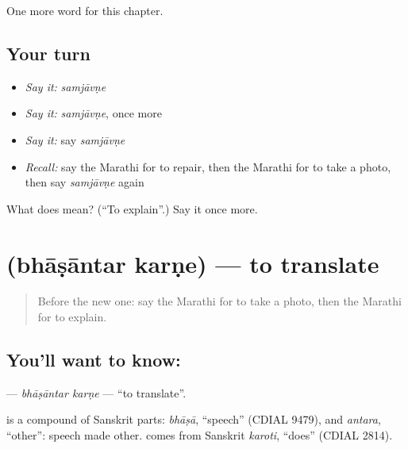 \begin{grammarlens}[title={What you've built}]
One more word for this chapter.
\end{grammarlens}

\subsection*{Your turn}
\begin{itemize}
\raggedright
  \item \emph{Say it:} \emph{samjāvṇe}
  \item \emph{Say it:} \emph{samjāvṇe}, once more
  \item \emph{Say it:} say \emph{samjāvṇe}
  \item \emph{Recall:} say the Marathi for to repair, then the Marathi for to take a photo, then say \emph{samjāvṇe} again
\end{itemize}

\begin{tcolorbox}[breakable,colback=teal!4,colframe=teal!35!black,title={Before you move on}]
What does  mean? (\textquotedblleft{}To explain\textquotedblright{}.) Say it once more.
\end{tcolorbox}
\section[\texorpdfstring{\mr{भाषांतर} \mr{करणे} (bhāṣāntar karṇe)}{भाषांतर करणे (bhāṣāntar karṇe)}]{  (bhāṣāntar karṇe) — to translate}

\label{lesson:MR-C223-bhasantar-karne}



\begin{quote}
Before the new one: say the Marathi for to take a photo, then the Marathi for to explain.
\end{quote}

\subsection*{You'll want to know:  }
\textbf{ } — \emph{bhāṣāntar karṇe} — \textquotedblleft{}to translate\textquotedblright{}.

\begin{cousinweb}
\textbf{} is a compound of Sanskrit parts: \emph{bhāṣā}, \textquotedblleft{}speech\textquotedblright{} (CDIAL 9479), and \emph{antara}, \textquotedblleft{}other\textquotedblright{}: speech made other. \textbf{} comes from Sanskrit \emph{karoti}, \textquotedblleft{}does\textquotedblright{} (CDIAL 2814).
\end{cousinweb}


